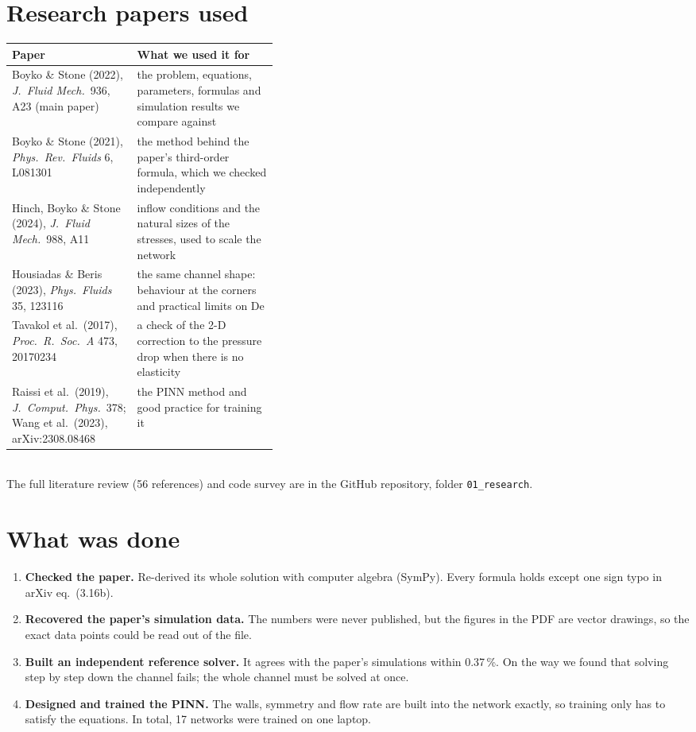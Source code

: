 \documentclass[10.5pt,a4paper]{article}
\newcommand{\code}[1]{\texttt{#1}}
\begin{document}
\section{Research papers used}
\begin{tabularx}{\linewidth}{@{}p{0.39\linewidth}X@{}}
\toprule
Paper & What we used it for\\
\midrule
Boyko \& Stone (2022), \emph{J.\ Fluid Mech.}\ 936, A23 (main paper) & the problem, equations, parameters, formulas and simulation results we compare against\\
Boyko \& Stone (2021), \emph{Phys.\ Rev.\ Fluids} 6, L081301 & the method behind the paper's third-order formula, which we checked independently\\
Hinch, Boyko \& Stone (2024), \emph{J.\ Fluid Mech.}\ 988, A11 & inflow conditions and the natural sizes of the stresses, used to scale the network\\
Housiadas \& Beris (2023), \emph{Phys.\ Fluids} 35, 123116 & the same channel shape: behaviour at the corners and practical limits on De\\
Tavakol et al.\ (2017), \emph{Proc.\ R.\ Soc.\ A} 473, 20170234 & a check of the 2-D correction to the pressure drop when there is no elasticity\\
Raissi et al.\ (2019), \emph{J.\ Comput.\ Phys.}\ 378; Wang et al.\ (2023), arXiv:2308.08468 & the PINN method and good practice for training it\\
\bottomrule
\end{tabularx}\\[2pt]
{\small The full literature review (56 references) and code survey are in the GitHub repository, folder \code{01\_research}.}

\section{What was done}
\begin{enumerate}[label=\arabic*.]
\item \textbf{Checked the paper.} Re-derived its whole solution with computer algebra (SymPy). Every formula holds except one sign typo in arXiv eq.\ (3.16b).
\item \textbf{Recovered the paper's simulation data.} The numbers were never published, but the figures in the PDF are vector drawings, so the exact data points could be read out of the file.
\item \textbf{Built an independent reference solver.} It agrees with the paper's simulations within 0.37\,\%. On the way we found that solving step by step down the channel fails; the whole channel must be solved at once.
\item \textbf{Designed and trained the PINN.} The walls, symmetry and flow rate are built into the network exactly, so training only has to satisfy the equations. In total, 17 networks were trained on one laptop.
\end{enumerate}
\end{document}
